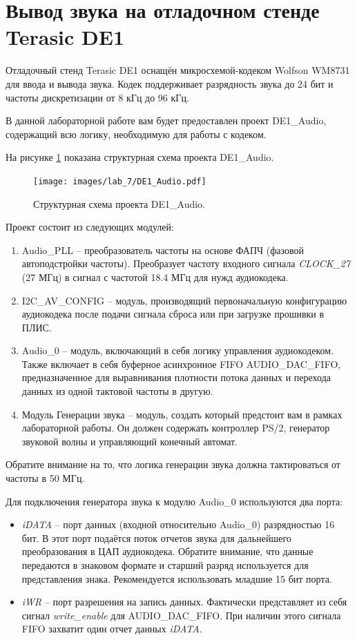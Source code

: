 \section{Вывод звука на отладочном стенде Terasic DE1}

Отладочный стенд Terasic DE1 оснащён микросхемой-кодеком Wolfson WM8731 для ввода и вывода звука. Кодек поддерживает разрядность звука до 24 бит и частоты дискретизации от 8 кГц до 96 кГц.


В данной лабораторной работе вам будет предоставлен проект DE1\_Audio, содержащий всю логику, необходимую для работы с кодеком.

На рисунке \ref{lab7:pic7} показана структурная схема проекта DE1\_Audio.

\begin{figure}[H]
	\centering
	\texttt{[image: images/lab\_7/DE1\_Audio.pdf]}
	\caption{Структурная схема проекта DE1\_Audio.}
	\label{lab7:pic7}
\end{figure}

Проект состоит из следующих модулей:
\begin{enumerate}
	\item Audio\_PLL -- преобразователь частоты на основе ФАПЧ (фазовой автоподстройки частоты). Преобразует частоту входного сигнала \textit{CLOCK\_27} (27 МГц) в сигнал с частотой 18.4 МГц для нужд аудиокодека.
	\item I2C\_AV\_CONFIG -- модуль, производящий первоначальную конфигурацию аудиокодека после подачи сигнала сброса или при загрузке прошивки в ПЛИС.
	\item Audio\_0 -- модуль, включающий в себя логику управления аудиокодеком. Также включает в себя буферное асинхронное FIFO AUDIO\_DAC\_FIFO, предназначенное для выравнивания плотности потока данных и перехода данных из одной тактовой частоты в другую.
	\item Модуль Генерации звука -- модуль, создать который предстоит вам в рамках лабораторной работы. Он должен содержать контроллер PS/2, генератор звуковой волны и управляющий конечный автомат.

\end{enumerate}

Обратите внимание на то, что логика генерации звука должна тактироваться от частоты в 50 МГц.



Для подключения генератора звука к модулю Audio\_0 используются два порта:
\begin{itemize}
	\item \textit{iDATA} -- порт данных (входной относительно Audio\_0) разрядностью 16 бит. В этот порт подаётся поток отчетов звука для дальнейшего преобразования в ЦАП аудиокодека. Обратите внимание, что данные передаются в знаковом формате и старший разряд используется для представления знака. Рекомендуется использовать младшие 15 бит порта.
	\item \textit{iWR} -- порт разрешения на запись данных. Фактически представляет из себя сигнал \textit{write\_enable} для AUDIO\_DAC\_FIFO. При наличии этого сигнала FIFO захватит один отчет данных \textit{iDATA}.

\end{itemize}


